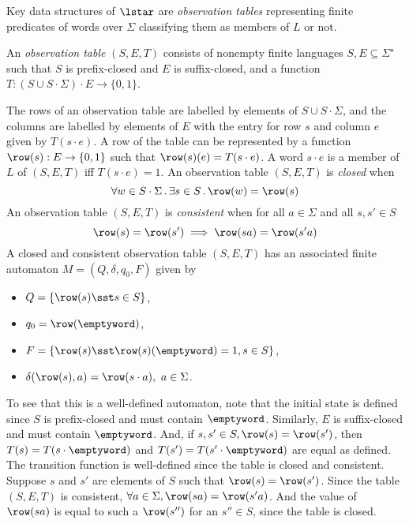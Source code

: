 Key data structures of $\lstar$ are \emph{observation tables}
representing finite predicates of words over $\Sigma$ classifying them
as members of $L$ or not.
\begin{definition}
  An \emph{observation table} $(S,E,T)$ consists of nonempty finite languages $S, E\subseteq\Sigma^\star$ such that $S$ is prefix-closed and $E$ is suffix-closed, and a function $T:(S\cup S\cdot \Sigma)\cdot E\rightarrow \{0,1\}$.
\end{definition}
The rows of an observation table are labelled by elements of
$S\cup S\cdot \Sigma$, and the columns are labelled by elements of $E$
with the entry for row $s$ and column $e$ given by $T(s\cdot e)$.
%
A row of the table can be represented by a function
$\row(s): E\rightarrow \{0,1\}$ such that $\row(s)(e)=T(s\cdot e)$.
%
A word $s\cdot e$ is a member of $L$ of $(S,E,T)$ iff
$T(s\cdot e)= 1$.  An observation table $(S,E,T)$ is \emph{closed}
when
%
\[
  \forall w\in S\cdot \Sigma\,.\,\exists s\in S\,.\,\row(w)=\row(s)
\]
An observation table $(S,E,T)$ is \emph{consistent} when for all
$a \in \Sigma$ and all $s,s'\in S$
%
\[
  \row(s)=\row(s')\implies \row(sa)=\row(s'a)
\]
%
A closed and consistent observation table $(S,E,T)$ has an associated
finite automaton $M=(Q,\delta,q_0,F)$ given by
\begin{itemize}
\item $Q =\{\row(s) \sst s \in S\}$,
\item $q_0 = \row(\emptyword)$,
\item $F =\{\row(s) \sst \row(s)(\emptyword)=1, s \in S \}$,
\item {$\delta(\row(s),a)=\row(s\cdot a),\ a\in \Sigma$.}
\end{itemize}

To see that this is a well-defined automaton, note that the initial state
is defined since $S$ is prefix-closed and must contain
$\emptyword$. Similarly, $E$ is suffix-closed and must contain
$\emptyword$. And, if $s,s'\in S, \row(s)=\row(s')$, then
$T(s)=T(s\cdot\emptyword)$ and $T(s')=T(s'\cdot\emptyword)$ are equal
as defined.
%
The transition function is well-defined since the table is closed and
consistent. Suppose $s$ and $s'$ are elements of $S$ such that
$\row(s)=\row(s')$. Since the table $(S,E,T)$ is consistent,
$\forall a\in \Sigma, \row(sa)=\row(s'a) $. And the value of
$\row(sa)$ is equal to such a $\row(s'')$ for an $s''\in S$, since the
table is closed.

